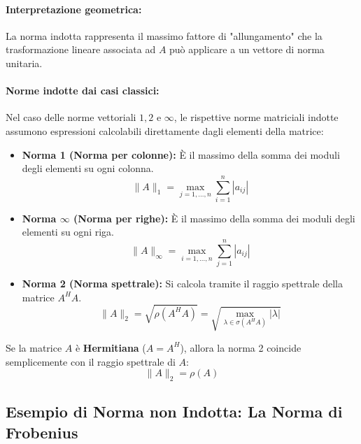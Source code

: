 \documentclass[a4paper,12pt]{article}
\begin{document}
	\paragraph{Interpretazione geometrica:}
	La norma indotta rappresenta il massimo fattore di "allungamento" che la trasformazione lineare associata ad $A$ può applicare a un vettore di norma unitaria.
	
	
	\paragraph{Norme indotte dai casi classici:}
	Nel caso delle norme vettoriali $1, 2$ e $\infty$, le rispettive norme matriciali indotte assumono espressioni calcolabili direttamente dagli elementi della matrice:
	
	\begin{itemize}
		\item \textbf{Norma 1 (Norma per colonne):}
		È il massimo della somma dei moduli degli elementi su ogni colonna.
		\begin{equation}
			\|A\|_1 = \max_{j=1, \dots, n} \sum_{i=1}^{n} |a_{ij}|
		\end{equation}
		
		\item \textbf{Norma $\infty$ (Norma per righe):}
		È il massimo della somma dei moduli degli elementi su ogni riga.
		\begin{equation}
			\|A\|_\infty = \max_{i=1, \dots, n} \sum_{j=1}^{n} |a_{ij}|
		\end{equation}
		
		\item \textbf{Norma 2 (Norma spettrale):}
		Si calcola tramite il raggio spettrale della matrice $A^H A$.
		\begin{equation}
			\|A\|_2 = \sqrt{\rho(A^H A)} = \sqrt{\max_{\lambda \in \sigma(A^H A)} |\lambda|}
		\end{equation}
	\end{itemize}
	
	\begin{tcolorbox}[title=Osservazione: Caso delle matrici Hermitiane, colback=yellow!5!white]
		Se la matrice $A$ è \textbf{Hermitiana} ($A = A^H$), allora la norma 2 coincide semplicemente con il raggio spettrale di $A$:
		\[ \|A\|_2 = \rho(A) \]
	\end{tcolorbox}
	\subsection{Esempio di Norma non Indotta: La Norma di Frobenius}
	
\end{document}

